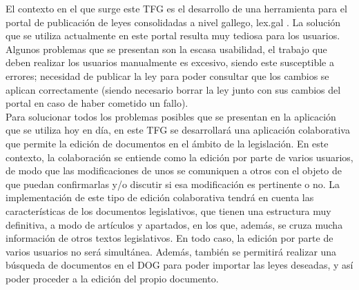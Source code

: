 El contexto en el que surge este TFG es el desarrollo de una herramienta para el portal de publicación de leyes consolidadas a nivel gallego, lex.gal \cite{lexgal}. La solución que se utiliza actualmente en este portal resulta muy tediosa para los usuarios. Algunos problemas que se presentan son la escasa usabilidad, el trabajo que deben realizar los usuarios manualmente es excesivo, siendo este susceptible a errores; necesidad de publicar la ley para poder consultar que los cambios se aplican correctamente (siendo necesario borrar la ley junto con sus cambios del portal en caso de haber cometido un fallo).
\\

Para solucionar todos los problemas posibles que se presentan en la aplicación que se utiliza hoy en día, en este TFG se desarrollará una aplicación colaborativa que permite la edición de documentos en el ámbito de la legislación. En este contexto, la colaboración se entiende como la edición por parte de varios usuarios, de modo que las modificaciones de unos se comuniquen a otros con el objeto de que puedan confirmarlas y/o discutir si esa modificación es pertinente o no. La implementación de este tipo de edición colaborativa tendrá en cuenta las características de los documentos legislativos, que tienen una estructura muy definitiva, a modo de artículos y apartados, en los que, además, se cruza mucha información de otros textos legislativos. En todo caso, la edición por parte de varios usuarios no será simultánea. Además, también se permitirá realizar una búsqueda de documentos en el DOG para poder importar las leyes deseadas, y así poder proceder a la edición del propio documento.